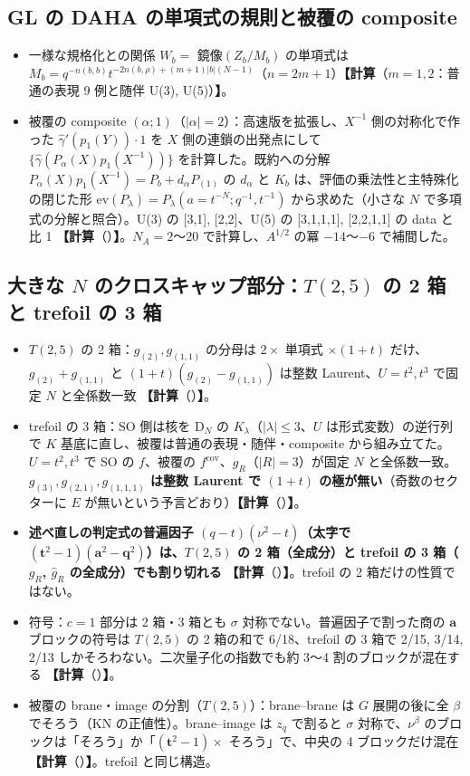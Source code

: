 \documentclass[a4paper,10pt]{ltjsarticle}
\newcommand{\ba}{\bm{a}}
\newcommand{\bq}{\bm{q}}
\newcommand{\bt}{\bm{t}}
\newcommand{\comp}[1]{\textbf{【計算}\if\relax\detokenize{#1}\relax\else（#1）\fi\textbf{】}}
\begin{document}
\subsection{GL の DAHA の単項式の規則と被覆の composite}
\begin{itemize}
\item 一様な規格化との関係 $W_b = $ 鏡像$(Z_b/M_b)$ の単項式は $M_b = q^{-n(b,b)} t^{-2n(b,\rho) + (m+1)|b|(N-1)}$（$n = 2m+1$）\comp{$m = 1, 2$：普通の表現 9 例と随伴 U(3), U(5)}。
\item 被覆の composite $(\alpha;1)$（$|\alpha| = 2$）：高速版を拡張し、$X^{-1}$ 側の対称化で作った $\hat\gamma'(p_1(Y))\cdot 1$ を $X$ 側の連鎖の出発点にして $\{\hat\gamma(P_\alpha(X) p_1(X^{-1}))\}$ を計算した。既約への分解 $P_\alpha(X)p_1(X^{-1}) = P_b + d_\alpha P_{(1)}$ の $d_\alpha$ と $K_b$ は、評価の乗法性と主特殊化の閉じた形 $\mathrm{ev}(P_\lambda) = P_\lambda(a = t^{-N}; q^{-1}, t^{-1})$ から求めた（小さな $N$ で多項式の分解と照合）。U(3) の [3,1], [2,2]、U(5) の [3,1,1,1], [2,2,1,1] の data と比 1 \comp{}。$N_A = 2$〜20 で計算し、$A^{1/2}$ の冪 $-14$〜$-6$ で補間した。
\end{itemize}

\subsection{大きな $N$ のクロスキャップ部分：$T(2,5)$ の 2 箱と trefoil の 3 箱}
\begin{itemize}
\item $T(2,5)$ の 2 箱：$g_{(2)}, g_{(1,1)}$ の分母は $2 \times$ 単項式 $\times (1+t)$ だけ、$g_{(2)} + g_{(1,1)}$ と $(1+t)(g_{(2)} - g_{(1,1)})$ は整数 Laurent、$U = t^2, t^3$ で固定 $N$ と全係数一致 \comp{}。
\item trefoil の 3 箱：SO 側は核を D$_N$ の $K_\lambda$（$|\lambda| \le 3$、$U$ は形式変数）の逆行列で $K$ 基底に直し、被覆は普通の表現・随伴・composite から組み立てた。$U = t^2, t^3$ で SO の $f$、被覆の $f^{\mathrm{cov}}$、$g_R$（$|R| = 3$）が固定 $N$ と全係数一致。\textbf{$g_{(3)}, g_{(2,1)}, g_{(1,1,1)}$ は整数 Laurent で $(1+t)$ の極が無い}（奇数のセクターに $E$ が無いという予言どおり）\comp{}。
\item \textbf{述べ直しの判定式の普遍因子 $(q - t)(\nu^2 - t)$（太字で $(\bt^2 - 1)(\ba^2 - \bq^2)$）は、$T(2,5)$ の 2 箱（全成分）と trefoil の 3 箱（$g_R$, $\hat g_R$ の全成分）でも割り切れる} \comp{}。trefoil の 2 箱だけの性質ではない。
\item 符号：$c = 1$ 部分は 2 箱・3 箱とも $\sigma$ 対称でない。普遍因子で割った商の $\ba$ ブロックの符号は $T(2,5)$ の 2 箱の和で 6/18、trefoil の 3 箱で 2/15, 3/14, 2/13 しかそろわない。二次量子化の指数でも約 3〜4 割のブロックが混在する \comp{}。
\item 被覆の brane・image の分割（$T(2,5)$）：brane--brane は $G$ 展開の後に全 $\beta$ でそろう（KN の正値性）。brane--image は $z_q$ で割ると $\sigma$ 対称で、$\nu^\beta$ のブロックは「そろう」か「$(\bt^2-1)\times$ そろう」で、中央の 4 ブロックだけ混在 \comp{}。trefoil と同じ構造。
\end{itemize}
\end{document}
